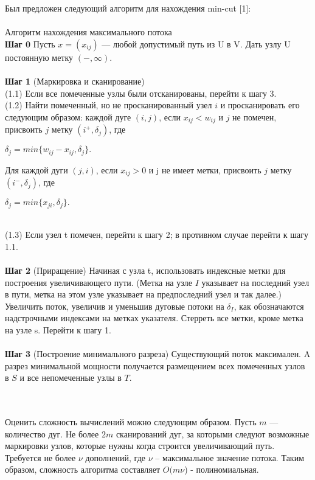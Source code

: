 Был предложен следующий алгоритм для нахождения min-cut [1]:
\\\\Алгоритм нахождения максимального потока
\\\textbf{Шаг 0} Пусть \(x = (x_{ij})\) — любой допустимый путь из U в V. Дать узлу U постоянную метку \((-, \infty)\).
\\\\\textbf{Шаг 1} (Маркировка и сканирование)
\\(1.1) Если все помеченные узлы были отсканированы, перейти к шагу 3.
\\(1.2) Найти помеченный, но не просканированный узел \(i\) и просканировать его следующим образом:
каждой дуге \((i, j)\), если \(x_{ij} < w_{ij}\) и \(j\) не помечен, присвоить \(j\) метку \((i^+, \delta_j)\), где
\begin{center}
{\(\delta_j = min\{w_{ij}-x_{ij}, \delta_j\}.\)}
\end{center}
Для каждой дуги \((j, i)\), если \(x_{ij} > 0\) и j не имеет метки, присвоить \(j\) метку \((i^-, \delta_j)\),
где
\begin{center}
{\(\delta_j = min\{x_{ji}, \delta_j\}.\)}
\end{center}
\\(1.3) Если узел t помечен, перейти к шагу 2; в противном случае перейти к шагу 1.1.
\\\\\textbf{Шаг 2} (Приращение) Начиная с узла t, использовать индексные метки для построения
увеличивающего пути. (Метка на узле \(I\) указывает на последний узел
в пути, метка на этом узле указывает на предпоследний узел и так
далее.) Увеличить поток, увеличив и уменьшив дуговые потоки на \(\delta_I\), как
обозначаются надстрочными индексами на метках указателя. Стерреть все метки, кроме
метка на узле s. Перейти к шагу 1.
\\\\\textbf{Шаг 3} (Построение минимального разреза) Существующий поток максимален. A
разрез минимальной мощности получается размещением всех помеченных узлов в \(S\)
и все непомеченные узлы в \(T\).

\\\\Оценить сложность вычислений можно следующим образом. Пусть
\(m\) — количество дуг. Не более \(2m\) сканирований дуг, за которыми следуют возможные
маркировки узлов, которые нужны когда строится увеличивающий путь.
Требуется не более \(\nu\) дополнений, где
\(\nu\) – максимальное значение потока. Таким образом, сложность алгоритма составляет \(O(m\nu\)) - полиномиальная.

